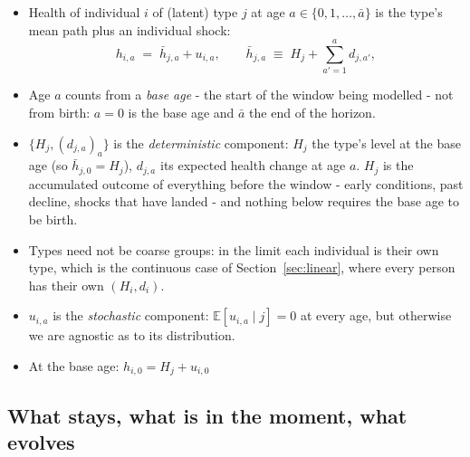 \documentclass[11pt]{article}
\theoremstyle{remark}
\newcommand{\E}{\mathbb{E}}
\begin{document}
\begin{itemize}
\item Health of individual $i$ of (latent) type $j$ at age $a\in\{0,1,\dots,\bar a\}$ is the type's mean path plus an individual shock:
\begin{equation}
h_{i,a} \;=\; \bar h_{j,a} + u_{i,a},
\qquad
\bar h_{j,a} \;\equiv\; H_j + \sum_{a'=1}^{a} d_{j,a'},
\label{eq:levels}
\end{equation}
\item Age $a$ counts from a \emph{base age} - the start of the window being modelled - not from birth: $a=0$ is the base age and $\bar a$ the end of the horizon.
\item $\{H_j,(d_{j,a})_a\}$ is the \emph{deterministic} component: $H_j$ the type's level at the base age (so $\bar h_{j,0}=H_j$), $d_{j,a}$ its expected health change at age $a$.
$H_j$ is the accumulated outcome of everything before the window - early conditions, past decline, shocks that have landed - and nothing below requires the base age to be birth.
\item Types need not be coarse groups: in the limit each individual is their own type, which is the continuous case of Section~\ref{sec:linear}, where every person has their own $(H_i,d_i)$.
\item $u_{i,a}$ is the \emph{stochastic} component: $\E[u_{i,a}\mid j]=0$ at every age, but otherwise we are agnostic as to its distribution.
\item At the base age: $h_{i,0}=H_j+u_{i,0}$
\end{itemize}

\subsection{What stays, what is in the moment, what evolves}\label{sec:triad}
\end{document}
